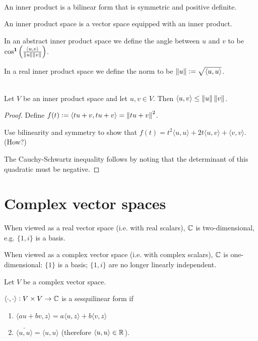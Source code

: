 \begin{definition*}~\\
  An inner product is a bilinear form that is symmetric and positive definite.

  An inner product space is a vector space equipped with an inner product.

  In an abstract inner product space we define the angle between $u$ and $v$ to be
  $\cos^{\mathbf 1}\Big(\frac{\langle u, v \rangle}{\left\Vert u \right\Vert\left\Vert v \right\Vert}\Big)$.

  In a real inner product space we define the norm to be $\left\Vert u \right\Vert := \sqrt{\langle u, u \rangle}$.
\end{definition*}

\begin{theorem*}~\\
  Let $V$ be an inner product space and let $u, v \in V$. Then
  $\langle u, v \rangle \leq \left\Vert u \right\Vert \left\Vert v \right\Vert$.
\end{theorem*}

\begin{proof}
  Define $f(t) := \langle tu + v, tu + v \rangle = \left\Vert tu +v \right\Vert^2$.

  Use bilinearity and symmetry to show that
  $f(t) = t^2 \langle u, u \rangle + 2t \langle u, v \rangle + \langle v, v \rangle$. (How?)

  The Cauchy-Schwartz inequality follows by noting that the determinant of this quadratic must be
  negative.
\end{proof}

\section{Complex vector spaces}
When viewed as a real vector space (i.e. with real scalars), $\mathbb{C}$ is
two-dimensional, e.g. $\{1, i\}$ is a basis.

When viewed as a complex vector space (i.e. with complex scalars), $\mathbb{C}$ is one-dimensional: $\{1\}$
is a basis; $\{1, i\}$ are no longer linearly independent.


\begin{definition*}
  Let $V$ be a complex vector space.

  $\langle \cdot, \cdot \rangle:V \times V \to \mathbb{C}$ is a sesquilinear form if
  \begin{enumerate}
  \item $\langle au + bv, z \rangle = a\langle u, z \rangle + b\langle v, z \rangle$
  \item $\bar{\langle u, u \rangle} = \langle u, u \rangle$ (therefore
    $\langle u, u \rangle \in \mathbb{R}$).
  \end{enumerate}
\end{definition*}


